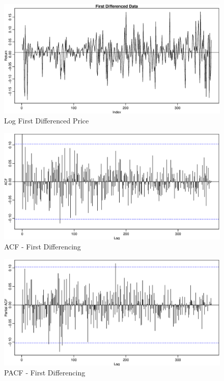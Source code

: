 \documentclass[letterpaper]{article} %
\begin{document}
\begin{figure}
    \includegraphics[width=\linewidth]{return.eps}
    \caption{Log First Differenced Price}
    \label{figure:return}
\end{figure}

\begin{figure}
    \includegraphics[width=\linewidth]{acf2.eps}
    \caption{ACF - First Differencing}
    \label{figure:acf2}
\end{figure}

\begin{figure}
    \includegraphics[width=\linewidth]{pacf2.eps}
    \caption{PACF - First Differencing}
    \label{figure:pacf2}
\end{figure}
\end{document}
